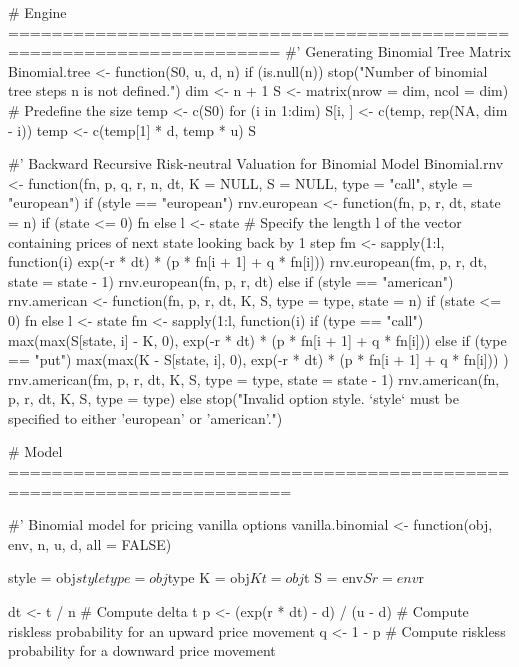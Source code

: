 \begin{Rminted}
# Engine =======================================================================
#' Generating Binomial Tree Matrix
Binomial.tree <- function(S0, u, d, n) {
    if (is.null(n)) stop("Number of binomial tree steps n is not defined.")
    dim <- n + 1
    S <- matrix(nrow = dim, ncol = dim) # Predefine the size
    temp <- c(S0)
    for (i in 1:dim) {
        S[i, ] <- c(temp, rep(NA, dim - i))
        temp <- c(temp[1] * d, temp * u)
    }
    S
}

#' Backward Recursive Risk-neutral Valuation for Binomial Model
Binomial.rnv <- function(fn, p, q, r, n, dt, K = NULL, S = NULL,
                         type = "call",
                         style = "european") {
    if (style == "european") {
        rnv.european <- function(fn, p, r, dt, state = n) {
            if (state <= 0) {
                fn
            } else {
                l <- state # Specify the length l of the vector containing prices of next state looking back by 1 step
                fm <- sapply(1:l, function(i) {exp(-r * dt) * (p * fn[i + 1] + q * fn[i])})
                rnv.european(fm, p, r, dt, state = state - 1)
            }
        }
        rnv.european(fn, p, r, dt)
    } else if (style == "american") {
        rnv.american <- function(fn, p, r, dt, K, S, type = type, state = n) {
            if (state <= 0) {
                fn
            } else {
                l <- state
                fm <- sapply(1:l, function(i) {
                    if (type == "call") {
                        max(max(S[state, i] - K, 0), exp(-r * dt) * (p * fn[i + 1] + q * fn[i]))
                    } else if (type == "put") {
                        max(max(K - S[state, i], 0), exp(-r * dt) * (p * fn[i + 1] + q * fn[i]))
                    }
                })
                rnv.american(fm, p, r, dt, K, S, type = type, state = state - 1)
            }
        }
        rnv.american(fn, p, r, dt, K, S, type = type)
    } else {
        stop("Invalid option style. `style` must be specified to either 'european' or 'american'.")
    }
}

# Model ========================================================================

#' Binomial model for pricing vanilla options
vanilla.binomial <- function(obj, env, n, u, d, all = FALSE) {

    style = obj$style
    type = obj$type
    K = obj$K
    t = obj$t
    S = env$S
    r = env$r

    dt <- t / n # Compute delta t
    p <- (exp(r * dt) - d) / (u - d) # Compute riskless probability for an upward price movement
    q <- 1 - p # Compute riskless probability for a downward price movement

}
\end{Rminted}
